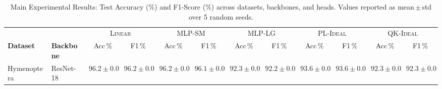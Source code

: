 \begin{table}[ht]
\centering
\caption{Main Experimental Results: Test Accuracy (\%) and F1-Score (\%) across datasets, backbones, and heads. Values reported as mean\,$\pm$\,std over 5 random seeds.}
\label{tab:main_results}
\setlength{\tabcolsep}{4pt}
\begin{tabular}{llcccccccccc}
\toprule
 &  & \multicolumn{2}{c}{\textsc{Linear}} & \multicolumn{2}{c}{\textsc{MLP-SM}} & \multicolumn{2}{c}{\textsc{MLP-LG}} & \multicolumn{2}{c}{\textsc{PL-Ideal}} & \multicolumn{2}{c}{\textsc{QK-Ideal}} \\
\cmidrule(lr){3-4} \cmidrule(lr){5-6} \cmidrule(lr){7-8} \cmidrule(lr){9-10} \cmidrule(lr){11-12}
\textbf{Dataset} & \textbf{Backbone} & Acc\,\% & F1\,\% & Acc\,\% & F1\,\% & Acc\,\% & F1\,\% & Acc\,\% & F1\,\% & Acc\,\% & F1\,\% \\
\midrule
Hymenoptera & ResNet-18 & $96.2 \pm 0.0$ & $96.2 \pm 0.0$ & $96.2 \pm 0.0$ & $96.1 \pm 0.0$ & $92.3 \pm 0.0$ & $92.2 \pm 0.0$ & $93.6 \pm 0.0$ & $93.6 \pm 0.0$ & $92.3 \pm 0.0$ & $92.3 \pm 0.0$ \\
\bottomrule
\end{tabular}
\end{table}
